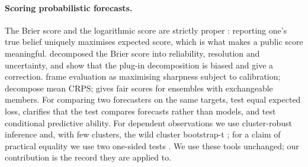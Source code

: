 \documentclass[11pt]{article}
\begin{document}
\paragraph{Scoring probabilistic forecasts.} The Brier score \citep{brier1950} and the logarithmic score are strictly proper \citep{gneiting2007proper}: reporting one's true belief uniquely maximises expected score, which is what makes a public score meaningful. \citet{murphy1973} decomposed the Brier score into reliability, resolution and uncertainty, and \citet{ferro2012bias} show that the plug-in decomposition is biased and give a correction. \citet{gneiting2007calibration} frame evaluation as maximising sharpness subject to calibration; \citet{arnold2024crps} decompose mean CRPS; \citet{ferro2014fair} gives fair scores for ensembles with exchangeable members. For comparing two forecasters on the same targets, \citet{diebold1995} test equal expected loss, \citet{diebold2015} clarifies that the test compares forecasts rather than models, and \citet{giacomini2006} test conditional predictive ability. For dependent observations we use cluster-robust inference \citep{cameron2011multiway} and, with few clusters, the wild cluster bootstrap-t \citep{cameron2008bootstrap}; for a claim of practical equality we use two one-sided tests \citep{schuirmann1987}. We use these tools unchanged; our contribution is the record they are applied to.
\end{document}
